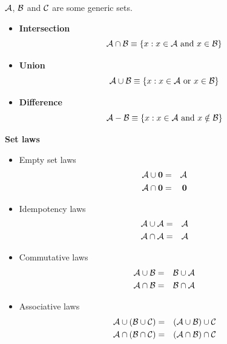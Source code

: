 \documentclass[justified,sixbynine]{tufte-book}
\def\subsubsection#1{{\bf #1}}
\theoremstyle{plain}%
\theoremstyle{definition}
\theoremstyle{remark}
\begin{document}
\begin{fullwidth}
${\cal A}$, ${\cal B}$ and ${\cal C}$ are some generic sets.

\begin{itemize}
\item  {\bf Intersection}
\begin{equation}
{\cal A}\cap {\cal B}\equiv \{x:x\in {\cal A}\text{ and }x\in
{\cal B}\}
\end{equation}

\item  {\bf Union}
\begin{equation}
{\cal A}\cup {\cal B}\equiv \{x:x\in {\cal A}\text{ or }x\in {\cal %
B}\}
\end{equation}

\item  {\bf Difference}
\begin{equation}
{\cal A}-{\cal B}\equiv \{x:x\in {\cal A}\text{ and }x\notin {\cal %
B}\}
\end{equation}
\end{itemize}

\subsubsection{Set laws}

\begin{itemize}
\item  Empty set laws
\begin{eqnarray}
{\cal A}\cup {\bf 0} &=&{\cal A} \\
{\cal A}\cap {\bf 0} &=&{\bf 0}
\end{eqnarray}

\item  Idempotency laws
\begin{eqnarray}
{\cal A}\cup {\cal A} &=&{\cal A} \\
{\cal A}\cap {\cal A} &=&{\cal A}
\end{eqnarray}

\item  Commutative laws
\begin{eqnarray}
{\cal A}\cup {\cal B} &=&{\cal B}\cup {\cal A} \\
{\cal A}\cap {\cal B} &=&{\cal B}\cap {\cal A}
\end{eqnarray}

\item  Associative laws
\begin{eqnarray}
{\cal A}\cup ({\cal B}\cup {\cal C}) &=&({\cal A}\cup {\cal B})\cup {\cal C}
\\
{\cal A}\cap ({\cal B\cap C}) &=&({\cal A\cap B})\cap {\cal C}
\end{eqnarray}


\end{itemize}
\end{fullwidth}
\end{document}

